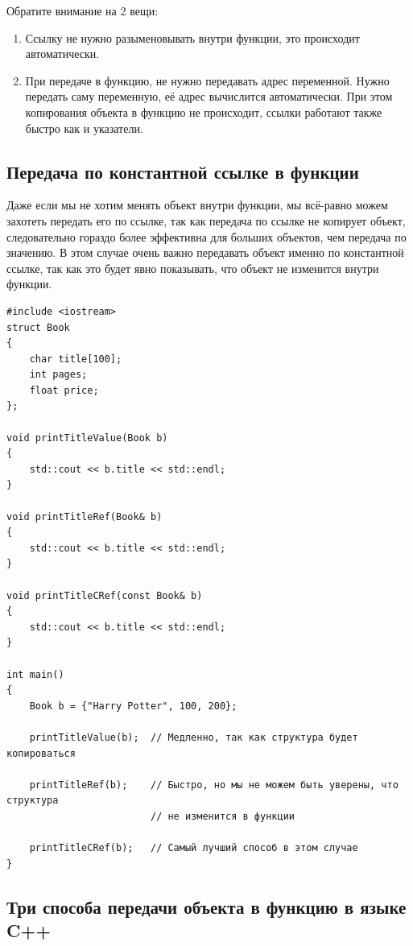 \documentclass{article}
\begin{document}
Обратите внимание на 2 вещи:
\begin{enumerate}
\item Ссылку не нужно разыменовывать внутри функции, это происходит автоматически.
\item При передаче в функцию, не нужно передавать адрес переменной. Нужно передать саму переменную, её адрес вычислится автоматически. При этом копирования объекта в функцию не происходит, ссылки работают также быстро как и указатели.
\end{enumerate}


\subsection*{Передача по константной ссылке в функции}
Даже если мы не хотим менять объект внутри функции, мы всё-равно можем захотеть передать его по ссылке, так как передача по ссылке не копирует объект, следовательно гораздо более эффективна для больших объектов, чем передача по значению. В этом случае очень важно передавать объект именно по константной ссылке, так как это будет явно показывать, что объект не изменится внутри функции.
\begin{lstlisting}
#include <iostream>
struct Book
{
    char title[100];
    int pages;
    float price;
};

void printTitleValue(Book b)
{
    std::cout << b.title << std::endl;
}

void printTitleRef(Book& b)
{
    std::cout << b.title << std::endl;
}

void printTitleCRef(const Book& b)
{
    std::cout << b.title << std::endl;
}

int main() 
{
    Book b = {"Harry Potter", 100, 200};

    printTitleValue(b);  // Медленно, так как структура будет копироваться
    
    printTitleRef(b);    // Быстро, но мы не можем быть уверены, что структура 
                         // не изменится в функции
                         
    printTitleCRef(b);   // Самый лучший способ в этом случае
}
\end{lstlisting}


\subsection*{Три способа передачи объекта в функцию в языке C++}
\end{document}
